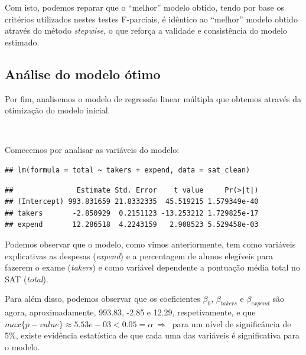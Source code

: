 \documentclass[]{article}
\begin{document}
Com isto, podemos reparar que o ``melhor'' modelo obtido, tendo por base
os critérios utilizados nestes testes F-parciais, é idêntico ao
``melhor'' modelo obtido através do método \emph{stepwise}, o que
reforça a validade e consistência do modelo estimado.

\subsection{Análise do modelo ótimo}

Por fim, analisemos o modelo de regressão linear múltipla que obtemos
através da otimização do modelo inicial.

\(\ \)

Comecemos por analisar as variáveis do modelo:

\begin{Shaded}
\begin{Highlighting}[]
\SpecialCharTok{$}
\end{Highlighting}
\end{Shaded}

\begin{verbatim}
## lm(formula = total ~ takers + expend, data = sat_clean)
\end{verbatim}

\begin{Shaded}
\begin{Highlighting}[]
\SpecialCharTok{$}
\end{Highlighting}
\end{Shaded}

\begin{verbatim}
##               Estimate Std. Error    t value     Pr(>|t|)
## (Intercept) 993.831659 21.8332335  45.519215 1.579349e-40
## takers       -2.850929  0.2151123 -13.253212 1.729825e-17
## expend       12.286518  4.2243159   2.908523 5.529458e-03
\end{verbatim}

Podemos observar que o modelo, como vimos anteriormente, tem como
variáveis explicativas as despesas (\emph{expend}) e a percentagem de
alunos elegíveis para fazerem o exame (\emph{takers}) e como variável
dependente a pontuação média total no SAT (\emph{total}).

Para além disso, podemos observar que os coeficientes \(\beta_0\),
\(\beta_{takers}\) e \(\beta_{expend}\) são agora, aproximadamente,
993.83, -2.85 e 12.29, respetivamente, e que
\(max\{p-value\} \approx 5.53e-03 < 0.05 = \alpha\ \Rightarrow\ \) para
um nível de significância de 5\%, existe evidência estatística de que
cada uma das variáveis é significativa para o modelo.
\end{document}
